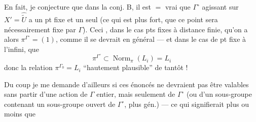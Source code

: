 En fait, je conjecture que dans la conj. B, il est $=$ vrai que $\Gamma^\circ$ agissant sur $X'=\widehat{\widetilde U}$ a un pt fixe et un seul (ce qui est plus fort, que ce point  sera nécessairement fixe par $\Gamma$). Ceci , dans le cas  pts fixes à distance finie, qu'on a alors $\pi^{\Gamma^\circ}=(1)$, comme il se devrait en général --- et dans le cas de pt fixe à l'infini, que
\[
\pi^{\Gamma^\circ}\subset\operatorname{Norm}_{\pi}(L_i)=L_i
\]
donc la relation $\pi^{\Gamma_0}=L_i$ ``hautement plausible'' de tantôt !

Du coup je me demande d'ailleurs si ces énoncés ne devraient pas être valables sans partir d'une action de $\Gamma$  entier, mais seulement de $\Gamma^\circ$ (ou d'un sous-groupe contenant un sous-groupe ouvert de $\Gamma^\circ$, plus gén.) --- ce qui signifierait plus ou moins que
